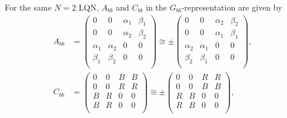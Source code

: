 \documentclass[a4paper,twocolumn,8pt,accepted=2021-12-15]{quantumarticle}
\newcommand{\nn}{\nonumber}
\def\a{\alpha}
\def\b{\beta}
\begin{document}
	For the same $N=2$ LQN, $A_{bb}$ and $C_{bb}$ in the $G_{bb}$-representation are given by
	\begin{align}\label{N=2_bipartite1}
		A_{bb}
		&= \begin{pmatrix}
			0&0&\a_1 & \b_1 \\
			0&0&\a_2 & \b_{2} \\
			\a_1 & \a_2 &0&0 \\
			\b_1 &\b_2 &0&0 \\ 
		\end{pmatrix} \cong 
		\pm \begin{pmatrix}
			0&0&\a_2 & \b_2\\
			0&0&\a_1 & \b_{1} \\
			\a_2 & \a_1 &0&0 \\
			\b_2 &\b_1 &0&0 \\ 
		\end{pmatrix}, \nn \\
			C_{bb}
		&= \begin{pmatrix}
			0&0& B & B \\
			0&0& R & R \\
			B & R &0&0 \\
			B & R &0&0 \\ 
		\end{pmatrix} \cong 
		\pm \begin{pmatrix}
			0&0&R & R\\
			0&0&B & B \\
			R & B &0&0 \\
			R & B &0&0 \\ 
		\end{pmatrix},
	\end{align}
\end{document}
